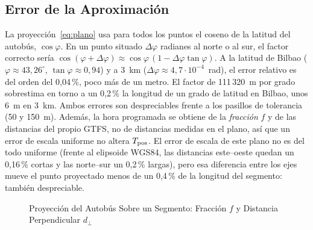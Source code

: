 \subsection{Error de la Aproximación} La proyección~\eqref{eq:plano} usa para todos los puntos el coseno de la
latitud del autobús, $\cos\varphi$. En un punto situado $\Delta\varphi$ radianes al norte o al sur, el factor correcto
sería $\cos(\varphi+\Delta\varphi)
\approx\cos\varphi\,(1-\Delta\varphi\tan\varphi)$. A la latitud de Bilbao ($\varphi\approx43{,}26^\circ$,
$\tan\varphi\approx0{,}94$) y a 3~km ($\Delta\varphi\approx4{,}7\cdot10^{-4}$~rad), el error relativo es del orden
del 0,04\,\%, poco más de un metro. El factor de 111\,320~m por grado sobrestima en torno a un 0,2\,\% la longitud
de un grado de latitud en Bilbao, unos 6~m en 3~km. Ambos errores son despreciables frente a los pasillos de
tolerancia (50 y 150~m). Además, la hora programada se obtiene de la \emph{fracción} $f$ y de las distancias del
propio GTFS, no de distancias medidas en el plano, así que un error de escala uniforme no altera $T_{\mathrm{pos}}$. El error de
escala de este plano no es del todo uniforme (frente al elipsoide WGS84, las distancias este–oeste quedan un 0,16\,\%
cortas y las norte–sur un 0,2\,\% largas), pero esa diferencia entre los ejes mueve el punto proyectado menos de un
0,4\,\% de la longitud del segmento: también despreciable.

\begin{figure}[ht]
\centering
\caption{Proyección del Autobús Sobre un Segmento: Fracción $f$ y Distancia Perpendicular $d_\perp$}\label{fig:proyeccion}
\end{figure}

